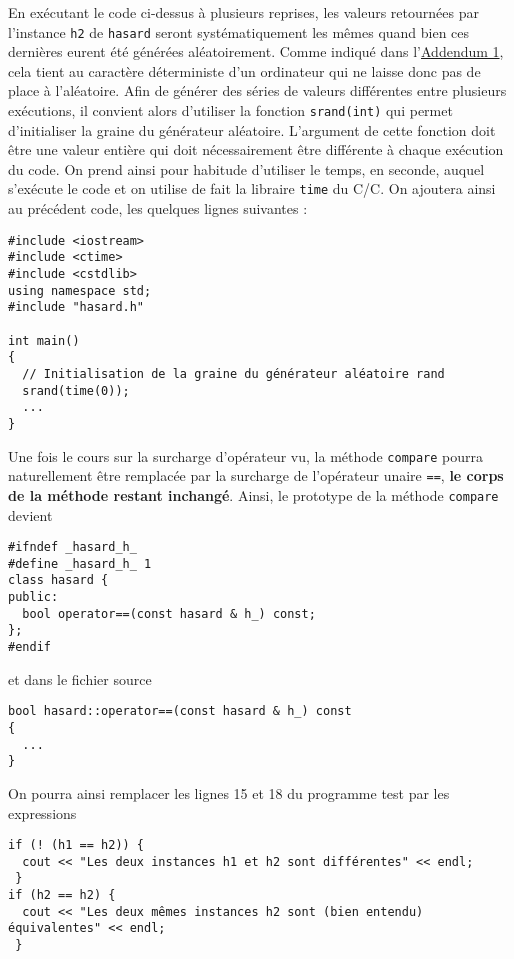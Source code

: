 \documentclass{book}
\newcommand{\cpp}{\mbox{C\vspace{.5em}\protect\raisebox{.2ex}{\footnotesize++~}}}
\begin{document}
\begin{correction}
En exécutant le code ci-dessus à plusieurs reprises, les valeurs retournées
par l'instance \texttt{h2} de \texttt{hasard} seront systématiquement les mêmes quand bien ces
dernières eurent été générées aléatoirement. Comme indiqué dans l'\hyperref[sec:orgheadline1]{Addendum 1},
cela tient au caractère déterministe d'un ordinateur qui ne laisse donc pas de
place à l'aléatoire. Afin de générer des séries de valeurs différentes entre
plusieurs exécutions, il convient alors d'utiliser la fonction \texttt{srand(int)} qui permet
d'initialiser la graine du générateur aléatoire. L'argument de cette fonction
doit être une valeur entière qui doit nécessairement être différente à chaque
exécution du code. On prend ainsi pour habitude d'utiliser le temps, en seconde,
auquel s'exécute le code et on utilise de fait la libraire \texttt{time} du C/\cpp. On
ajoutera ainsi au précédent code, les quelques lignes suivantes :
\begin{verbatim}
#include <iostream>
#include <ctime>
#include <cstdlib>
using namespace std;
#include "hasard.h"

int main()
{
  // Initialisation de la graine du générateur aléatoire rand
  srand(time(0));
  ...
}
\end{verbatim}

Une fois le cours sur la surcharge d'opérateur vu, la méthode \texttt{compare} pourra
naturellement être remplacée par la surcharge de l'opérateur unaire \texttt{==}, \textbf{le
corps de la méthode restant inchangé}. Ainsi, le prototype de la méthode \texttt{compare}
devient
\begin{verbatim}
#ifndef _hasard_h_
#define _hasard_h_ 1
class hasard {
public:
  bool operator==(const hasard & h_) const;
};
#endif
\end{verbatim}
et dans le fichier source
\begin{verbatim}
bool hasard::operator==(const hasard & h_) const
{
  ...
}
\end{verbatim}
On pourra ainsi remplacer les lignes 15 et 18 du programme test par les
expressions
\begin{verbatim}
if (! (h1 == h2)) {
  cout << "Les deux instances h1 et h2 sont différentes" << endl;
 }
if (h2 == h2) {
  cout << "Les deux mêmes instances h2 sont (bien entendu) équivalentes" << endl;
 }
\end{verbatim}


\end{correction}
\end{document}
